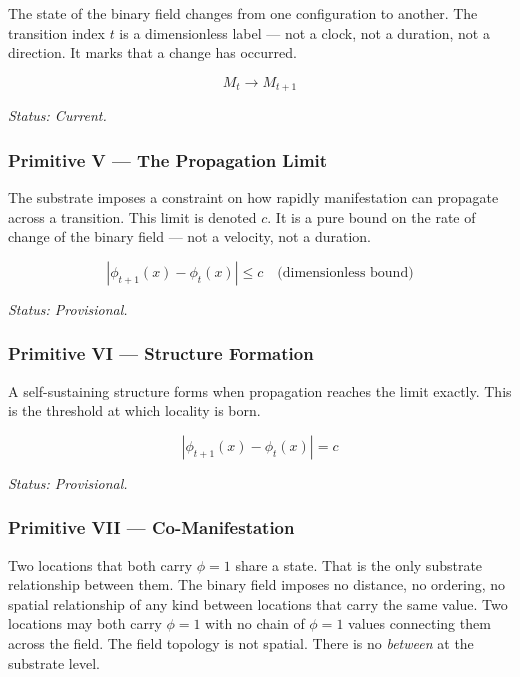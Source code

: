 \documentclass[11pt,letterpaper]{article}
\begin{document}
The state of the binary field changes from one configuration to another. The transition index \(t\) is a dimensionless label --- not a clock, not a duration, not a direction. It marks that a change has occurred.

\begin{equation}
M_t \to M_{t+1}
\end{equation}

\emph{Status: Current.}
\subsubsection{Primitive V --- The Propagation Limit}
\label{sec:orgccf074a}

The substrate imposes a constraint on how rapidly manifestation can propagate across a transition. This limit is denoted \(c\). It is a pure bound on the rate of change of the binary field --- not a velocity, not a duration.

\begin{equation}
|\phi_{t+1}(x) - \phi_t(x)| \leq c \quad \text{(dimensionless bound)}
\end{equation}

\emph{Status: Provisional.}
\subsubsection{Primitive VI --- Structure Formation}
\label{sec:orgfeb0fc8}

A self-sustaining structure forms when propagation reaches the limit exactly. This is the threshold at which locality is born.

\begin{equation}
|\phi_{t+1}(x) - \phi_t(x)| = c
\end{equation}

\emph{Status: Provisional.}
\subsubsection{Primitive VII --- Co-Manifestation}
\label{sec:orgf3d4036}

Two locations that both carry \(\phi = 1\) share a state. That is the only substrate relationship between them. The binary field imposes no distance, no ordering, no spatial relationship of any kind between locations that carry the same value. Two locations may both carry \(\phi = 1\) with no chain of \(\phi = 1\) values connecting them across the field. The field topology is not spatial. There is no \emph{between} at the substrate level.
\end{document}
